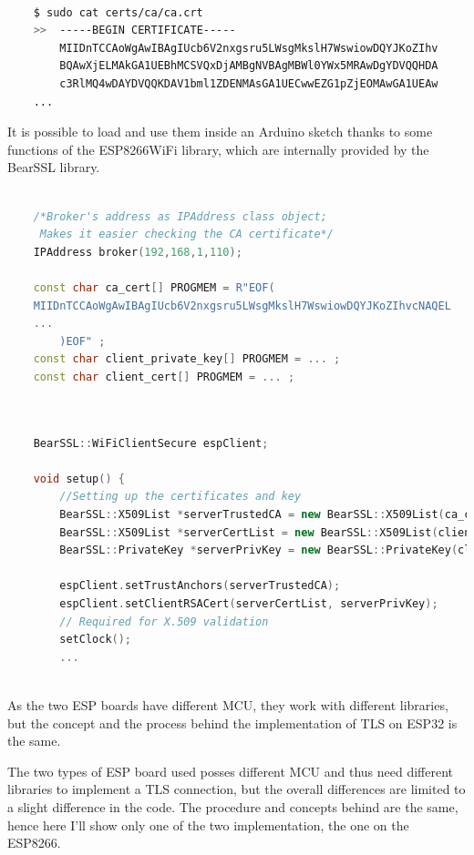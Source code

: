 \documentclass[target=bach,aauheader=,style=]{thud}
\begin{document}
\begin{lstlisting}[language=bash, style=bash]
	
	$ sudo cat certs/ca/ca.crt
	>>	-----BEGIN CERTIFICATE-----
		MIIDnTCCAoWgAwIBAgIUcb6V2nxgsru5LWsgMkslH7WswiowDQYJKoZIhv
		BQAwXjELMAkGA1UEBhMCSVQxDjAMBgNVBAgMBWl0YWx5MRAwDgYDVQQHDA
		c3RlMQ4wDAYDVQQKDAV1bml1ZDENMAsGA1UECwwEZG1pZjEOMAwGA1UEAw
	...
\end{lstlisting}

It is possible to load and use them inside an Arduino sketch thanks to some functions of the ESP8266WiFi library, which are internally provided by the BearSSL library.
\begin{lstlisting}[language=c++,style=cpp]
	
	/*Broker's address as IPAddress class object; 
	 Makes it easier checking the CA certificate*/
	IPAddress broker(192,168,1,110);
	
	const char ca_cert[] PROGMEM = R"EOF(
	MIIDnTCCAoWgAwIBAgIUcb6V2nxgsru5LWsgMkslH7WswiowDQYJKoZIhvcNAQEL
	...	
		)EOF" ;
	const char client_private_key[] PROGMEM = ... ;
	const char client_cert[] PROGMEM = ... ;
	
\end{lstlisting}

\begin{lstlisting}[language=c++,style=cpp]
	
	BearSSL::WiFiClientSecure espClient;
	
	void setup() {
		//Setting up the certificates and key
		BearSSL::X509List *serverTrustedCA = new BearSSL::X509List(ca_cert);
		BearSSL::X509List *serverCertList = new BearSSL::X509List(client_cert);
		BearSSL::PrivateKey *serverPrivKey = new BearSSL::PrivateKey(client_private_key);
		
		espClient.setTrustAnchors(serverTrustedCA);
		espClient.setClientRSACert(serverCertList, serverPrivKey);
		// Required for X.509 validation
		setClock();
		...
	
\end{lstlisting}

As the two ESP boards have different MCU, they work with different libraries, but the concept and the process behind the implementation of TLS on ESP32 is the same.

The two types of ESP board used posses different MCU and thus need different libraries to implement a TLS connection, but the overall differences are limited to a slight difference in the code. The procedure and concepts behind are the same, hence here I'll show only one of the two implementation, the one on the ESP8266.
\end{document}
